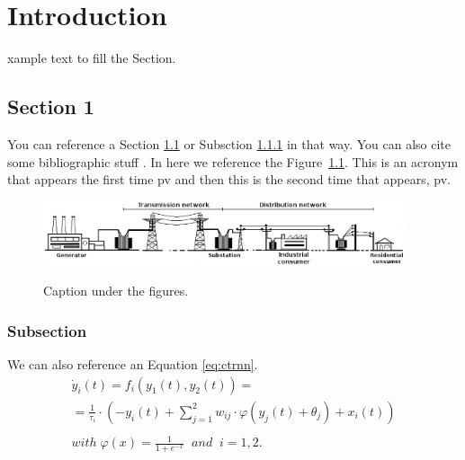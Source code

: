 \chapter{Introduction}
\label{chap1:intro}
\graphicspath{{../figs/chap1_intro/}} 
\glsresetall
{}

xample text to fill the Section. \lipsum[1-5]

\section{Section 1}
\label{sec:sec1}

You can reference a Section \ref{sec:sec1} or Subsction \ref{sec:subsec} in that way. 
You can also cite some bibliographic stuff \citep{ExArt01,ExIncollec01,ExInpro01,ExTech01,ExBook01,ExPHD01}.
In here we reference the Figure~\ref{fig:fig1}.
This is an acronym that appears the first time \gls{pv} and then this is the second time that appears, \gls{pv}.  

\begin{figure}[!t]	
	\begin{center}
		\includegraphics[width=0.95\textwidth]{grid_sketch.eps} \\ 
		\caption[Short description for the index.]
		{Caption under the figures.}		
		\label{fig:fig1}	
	\end{center}
\end{figure}


\subsection{Subsection}
\label{sec:subsec}

We can also reference an Equation \ref{eq:ctrnn}.
\begin{equation}
\begin{array}{l}
\dot y_{i}(t)= f_i(y_1(t),y_2(t)) = \\ 
= \frac{1}{\tau_i}\cdot\left(-y_i(t)+\sum_{j=1}^2w_{ij}\cdot \varphi\left(y_j(t)+\theta_j\right)+x_i(t)\right) \\\\
with\;\varphi(x)=\frac{1}{1+e^{-x}}\;\;and\;\;i=1,2.
\end{array}
\label{eq:ctrnn}
\end{equation}

